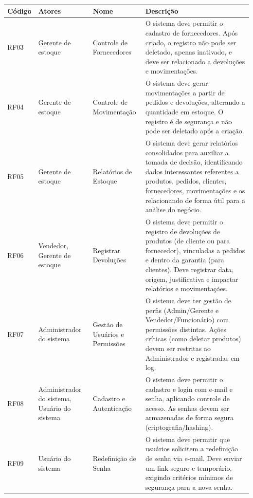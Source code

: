 \documentclass[
	12pt,				%
	openany,			%
	twoside,			%
	a4paper,			%
	english,			%
	brazil				%
	]{abntex2}
\begin{document}
\begin{quadro}[htb]
\centering
\caption{\label{quadro_rf2}Requisitos Funcionais (RF3 a RF10)}
\begin{tabular}{|p{1.4cm}|p{2.8cm}|p{4.5cm}|p{7.0cm}|}
    \hline
    \textbf{Código} & \textbf{Atores} & \textbf{Nome} & \textbf{Descrição} \\ \hline

       RF03 & Gerente de estoque & Controle de Fornecedores & O sistema deve permitir o cadastro de fornecedores. Após criado, o registro não pode ser deletado, apenas inativado, e deve ser relacionado a devoluções e movimentações. \\ \hline

    RF04 & Gerente de estoque & Controle de Movimentação & O sistema deve gerar movimentações a partir de pedidos e devoluções, alterando a quantidade em estoque. O registro é de segurança e não pode ser deletado após a criação. \\ \hline

    RF05 & Gerente de estoque & Relatórios de Estoque & O sistema deve gerar relatórios consolidados para auxiliar a tomada de decisão, identificando dados interessantes referentes a produtos, pedidos, clientes, fornecedores, movimentações e os relacionando de forma útil para a análise do negócio. \\ \hline

    RF06 & Vendedor, Gerente de estoque & Registrar Devoluções & O sistema deve permitir o registro de devoluções de produtos (de cliente ou para fornecedor), vinculadas a pedidos e dentro da garantia (para clientes). Deve registrar data, origem, justificativa e impactar relatórios e movimentações. \\ \hline

    RF07 & Administrador do sistema & Gestão de Usuários e Permissões & O sistema deve ter gestão de perfis (Admin/Gerente e Vendedor/Funcionário) com permissões distintas. Ações críticas (como deletar produtos) devem ser restritas ao Administrador e registradas em log. \\ \hline

    RF08 & Administrador do sistema, Usuário do sistema & Cadastro e Autenticação & O sistema deve permitir o cadastro e login com e-mail e senha, aplicando controle de acesso. As senhas devem ser armazenadas de forma segura (criptografia/hashing). \\ \hline

    RF09 & Usuário do sistema & Redefinição de Senha & O sistema deve permitir que usuários solicitem a redefinição de senha via e-mail. Deve enviar um link seguro e temporário, exigindo critérios mínimos de segurança para a nova senha. \\ \hline


\end{tabular}
\end{quadro}
\end{document}
